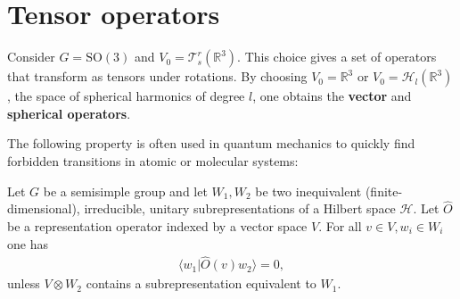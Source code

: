 \section{Tensor operators}

    \begin{example}
        Consider $G=\mathrm{SO}(3)$ and $V_0=\mathcal{T}^r_s(\mathbb{R}^3)$. This choice gives a set of operators that transform as tensors under rotations. By choosing $V_0=\mathbb{R}^3$ or $V_0=\mathcal{H}_l(\mathbb{R}^3)$, the space of spherical harmonics of degree $l$, one obtains the \textbf{vector} and \textbf{spherical operators}.
    \end{example}

    The following property is often used in quantum mechanics to quickly find forbidden transitions in atomic or molecular systems:
    \begin{property}
        Let $G$ be a semisimple group and let $W_1,W_2$ be two inequivalent (finite-dimensional), irreducible, unitary subrepresentations of a Hilbert space $\mathcal{H}$. Let $\hat{O}$ be a representation operator indexed by a vector space $V$. For all $v\in V,w_i\in W_i$ one has
        \begin{gather}
            \langle w_1|\hat{O}(v)w_2\rangle = 0,
        \end{gather}
        unless $V\otimes W_2$ contains a subrepresentation equivalent to $W_1$.
    \end{property}

